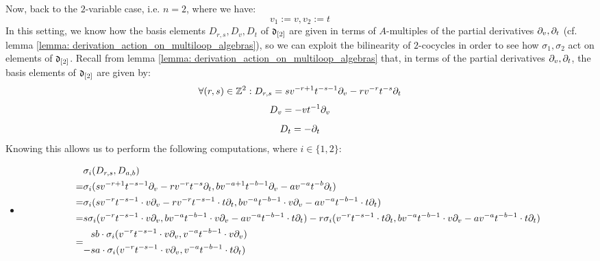 \begin{example}
            Now, back to the $2$-variable case, i.e. $n = 2$, where we have:
                $$v_1 := v, v_2 := t$$
            In this setting, we know how the basis elements $D_{r, s}, D_v, D_t$ of $\d_{[2]}$ are given in terms of $A$-multiples of the partial derivatives $\del_v, \del_t$ (cf. lemma \ref{lemma: derivation_action_on_multiloop_algebras}), so we can exploit the bilinearity of $2$-cocycles in order to see how $\sigma_1, \sigma_2$ act on elements of $\d_{[2]}$. Recall from lemma \ref{lemma: derivation_action_on_multiloop_algebras} that, in terms of the partial derivatives $\del_v, \del_t$, the basis elements of $\d_{[2]}$ are given by:
                $$\forall (r, s) \in \Z^2: D_{r, s} = s v^{-r + 1} t^{-s - 1} \del_v - r v^{-r} t^{-s} \del_t$$
                $$D_v = -v t^{-1} \del_v$$
                $$D_t = -\del_t$$
            Knowing this allows us to perform the following computations, where $i \in \{1, 2\}$:
            \begin{itemize}
                \item 
                    $$
                        \begin{aligned}
                            & \sigma_i(D_{r, s}, D_{a, b})
                            \\
                            = & \sigma_i( s v^{-r + 1} t^{-s - 1} \del_v - r v^{-r} t^{-s} \del_t, b v^{-a + 1} t^{-b - 1} \del_v - a v^{-a} t^{-b} \del_t )
                            \\
                            = & \sigma_i( s v^{-r} t^{-s - 1} \cdot v\del_v - r v^{-r} t^{-s - 1} \cdot t \del_t, b v^{-a} t^{-b - 1} \cdot v\del_v - a v^{-a} t^{-b - 1} \cdot t \del_t )
                            \\
                            = & s \sigma_i( v^{-r} t^{-s - 1} \cdot v\del_v, b v^{-a} t^{-b - 1} \cdot v\del_v - a v^{-a} t^{-b - 1} \cdot t \del_t ) - r \sigma_i( v^{-r} t^{-s - 1} \cdot t \del_t, b v^{-a} t^{-b - 1} \cdot v\del_v - a v^{-a} t^{-b - 1} \cdot t \del_t )
                            \\
                            = &
                            \begin{aligned}
                                & s b \cdot \sigma_i( v^{-r} t^{-s - 1} \cdot v\del_v, v^{-a} t^{-b - 1} \cdot v\del_v )
                                \\
                                - & s a \cdot \sigma_i( v^{-r} t^{-s - 1} \cdot v\del_v, v^{-a} t^{-b - 1} \cdot t \del_t )
                                \\

\end{aligned}
\end{aligned}$$
\end{itemize}
\end{example}

